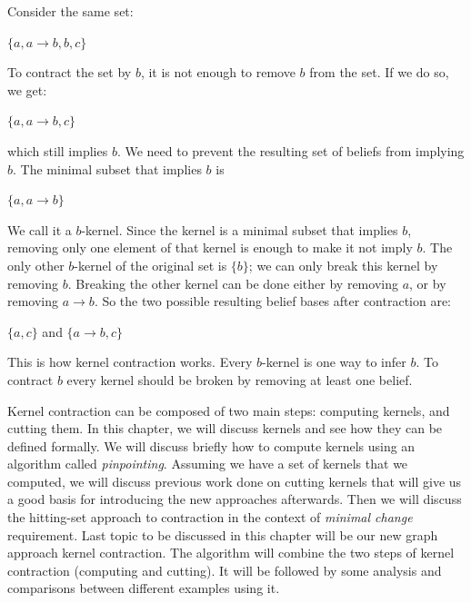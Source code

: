 Consider the same set:
\begin{center}
$ \lbrace a, a \rightarrow b, b, c \rbrace $
\end{center}
To contract the set by $b$, it is not enough to remove $b$ from the set. If we do so, we get:
\begin{center}
$ \lbrace a, a \rightarrow b, c \rbrace $
\end{center}
which still implies $b$. We need to prevent the resulting set of beliefs from implying $b$. The minimal subset that implies $b$ is 
\begin{center}
$ \lbrace a, a \rightarrow b \rbrace $
\end{center}
We call it a $b$-kernel. Since the kernel is a minimal subset that implies $b$, removing only one element of that kernel is enough to make it not imply $b$. The only other $b$-kernel of the original set is $\lbrace b \rbrace$; we can only break this kernel by removing $b$. Breaking the other kernel can be done either by removing $a$, or by removing $a \rightarrow b$. So the two possible resulting belief bases after contraction are:
\begin{center}
$ \lbrace a, c \rbrace $ and $ \lbrace a \rightarrow b, c \rbrace $
\end{center}
This is how kernel contraction works. Every $b$-kernel is one way to infer $b$. To contract $b$ every kernel should be broken by removing at least one belief. 

Kernel contraction can be composed of two main steps: computing kernels, and cutting them. In this chapter, we will discuss kernels and see how they can be defined formally. We will discuss briefly how to compute kernels using an algorithm called \textit{pinpointing}. Assuming we have a set of kernels that we computed, we will discuss previous work done on cutting kernels that will give us a good basis for introducing the new approaches afterwards. Then we will discuss the hitting-set approach to contraction in the context of \textit{minimal change} requirement. Last topic to be discussed in this chapter will be our new graph approach kernel contraction. The algorithm will combine the two steps of kernel contraction (computing and cutting). It will be followed by some analysis and comparisons between different examples using it.


